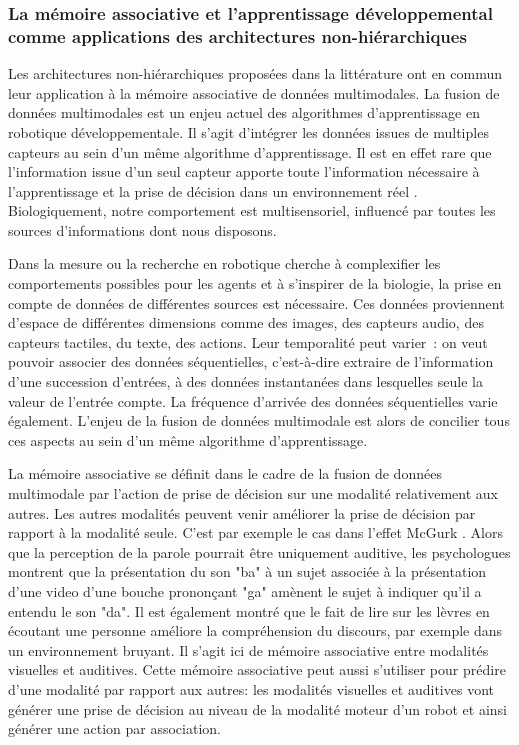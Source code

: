 \documentclass[../main]{subfiles}
\begin{document}
\subsubsection{La mémoire associative et l'apprentissage développemental comme applications des architectures non-hiérarchiques}

Les architectures non-hiérarchiques proposées dans la littérature ont en commun leur application à la mémoire associative de données multimodales.
La fusion de données multimodales est un enjeu actuel des algorithmes d'apprentissage en robotique développementale.
Il s'agit d'intégrer les données issues de multiples capteurs au sein d'un même algorithme d'apprentissage.
Il est en effet rare que l'information issue d'un seul capteur apporte toute l'information nécessaire à l'apprentissage et la prise de décision dans un environnement réel \cite{lahat2015}. Biologiquement, notre comportement est multisensoriel, influencé par toutes les sources d'informations dont nous disposons.

Dans la mesure ou la recherche en robotique cherche à complexifier les comportements possibles pour les agents et à s'inspirer de la biologie, la prise en compte de données de différentes sources est nécessaire. Ces données proviennent d'espace de différentes dimensions comme des images, des capteurs audio, des capteurs tactiles, du texte, des actions. Leur temporalité peut varier~: on veut pouvoir associer des données séquentielles, c'est-à-dire extraire de l'information d'une succession d'entrées, à des données instantanées dans lesquelles seule la valeur de l'entrée compte. La fréquence d'arrivée des données séquentielles varie également.
L'enjeu de la fusion de données multimodale est alors de concilier tous ces aspects au sein d'un même algorithme d'apprentissage.

La mémoire associative se définit dans le cadre de la fusion de données multimodale par l'action de prise de décision sur une modalité relativement aux autres.
Les autres modalités peuvent venir améliorer la prise de décision par rapport à la modalité seule. C'est par exemple le cas dans l'effet McGurk \cite{McGurk1976HearingLA}. Alors que la perception de la parole pourrait être uniquement auditive, les psychologues montrent que la présentation du son "ba" à un sujet associée à la présentation d'une video d'une bouche prononçant "ga" amènent le sujet à indiquer qu'il a entendu le son "da". Il est également montré que le fait de lire sur les lèvres en écoutant une personne améliore la compréhension du discours, par exemple dans un environnement bruyant. Il s'agit ici de mémoire associative entre modalités visuelles et auditives.
Cette mémoire associative peut aussi s'utiliser pour prédire d'une modalité par rapport aux autres: les modalités visuelles et auditives vont générer une prise de décision au niveau de la modalité moteur d'un robot et ainsi générer une action par association.
\end{document}
